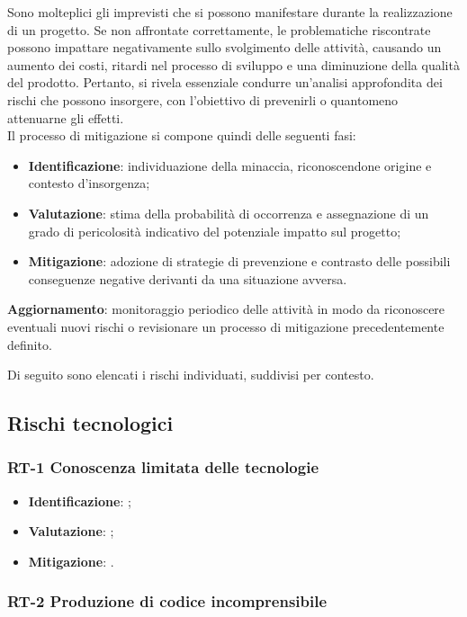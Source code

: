 Sono molteplici gli imprevisti che si possono manifestare durante la realizzazione di un progetto. Se non affrontate correttamente, le problematiche riscontrate possono impattare negativamente sullo svolgimento delle attività, causando un aumento dei costi, ritardi nel processo di sviluppo e una diminuzione della qualità del prodotto. Pertanto, si rivela essenziale condurre un'analisi approfondita dei rischi che possono insorgere, con l'obiettivo di prevenirli o quantomeno attenuarne gli effetti. \\
Il processo di mitigazione si compone quindi delle seguenti fasi: 
\begin{itemize}
\setlength\itemsep{0em}
    \item \textbf{Identificazione}: individuazione della minaccia, riconoscendone origine e contesto d'insorgenza;
    \item \textbf{Valutazione}: stima della probabilità di occorrenza e assegnazione di un grado di pericolosità indicativo del potenziale impatto sul progetto;
    \item \textbf{Mitigazione}: adozione di strategie di prevenzione e contrasto delle possibili conseguenze negative derivanti da una situazione avversa.
\end{itemize}
\textbf{Aggiornamento}: monitoraggio periodico delle attività in modo da riconoscere eventuali nuovi rischi o revisionare un processo di mitigazione precedentemente definito.

Di seguito sono elencati i rischi individuati, suddivisi per contesto.

\subsection{Rischi tecnologici}
\subsubsection{RT-1 Conoscenza limitata delle tecnologie}

\begin{itemize}
\setlength\itemsep{0em}
    \item \textbf{Identificazione}: ;
    \item \textbf{Valutazione}: ;
    \item \textbf{Mitigazione}: .
\end{itemize}

\subsubsection{RT-2 Produzione di codice incomprensibile}

